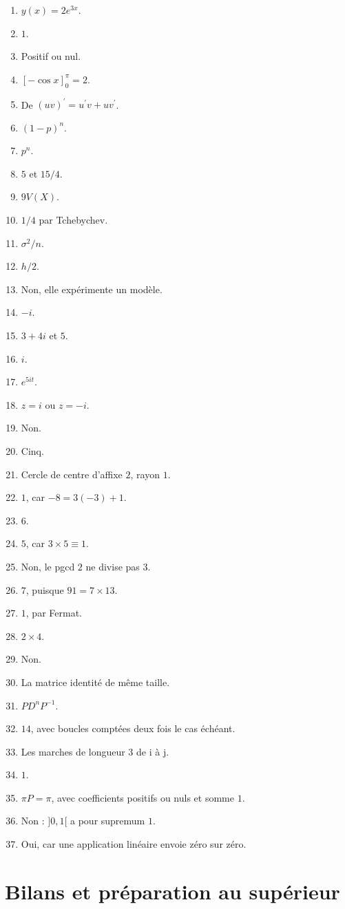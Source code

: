 \begin{enumerate}
\item $y(x)=2e^{3x}$.
\item $1$.
\item Positif ou nul.
\item $[-\cos x]_0^\pi=2$.
\item De $(uv)^{\prime}=u^{\prime}v+uv^{\prime}$.
\item $(1-p)^n$.
\item $p^n$.
\item $5$ et $15/4$.
\item $9V(X)$.
\item $1/4$ par Tchebychev.
\item $\sigma^2/n$.
\item $h/2$.
\item Non, elle expérimente un modèle.
\item $-i$.
\item $3+4i$ et $5$.
\item $i$.
\item $e^{5it}$.
\item $z=i$ ou $z=-i$.
\item Non.
\item Cinq.
\item Cercle de centre d’affixe $2$, rayon $1$.
\item $1$, car $-8=3(-3)+1$.
\item $6$.
\item $5$, car $3\times5\equiv1$.
\item Non, le pgcd $2$ ne divise pas $3$.
\item $7$, puisque $91=7\times13$.
\item $1$, par Fermat.
\item $2\times4$.
\item Non.
\item La matrice identité de même taille.
\item $PD^nP^{-1}$.
\item $14$, avec boucles comptées deux fois le cas échéant.
\item Les marches de longueur 3 de i à j.
\item $1$.
\item $\pi P=\pi$, avec coefficients positifs ou nuls et somme $1$.
\item Non : $]0,1[$ a pour supremum $1$.
\item Oui, car une application linéaire envoie zéro sur zéro.\end{enumerate}
\chapter{Bilans et préparation au supérieur}
